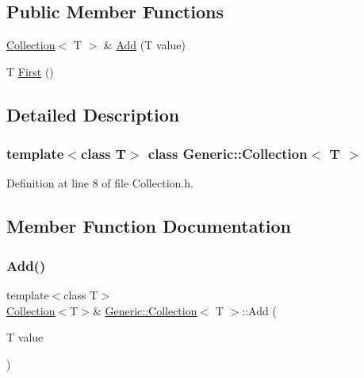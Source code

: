 \subsection*{Public Member Functions}
\begin{DoxyCompactItemize}
\item 
\mbox{\hyperlink{classGeneric_1_1Collection}{Collection}}$<$ T $>$ \& \mbox{\hyperlink{classGeneric_1_1Collection_a602c700fa46602ce551b5c133793924c}{Add}} (T value)
\item 
T \mbox{\hyperlink{classGeneric_1_1Collection_abc2e126c8aaaabf8e4ff8da2d35011c3}{First}} ()
\end{DoxyCompactItemize}


\subsection{Detailed Description}
\subsubsection*{template$<$class T$>$\newline
class Generic\+::\+Collection$<$ T $>$}



Definition at line 8 of file Collection.\+h.



\subsection{Member Function Documentation}
\mbox{\label{classGeneric_1_1Collection_a602c700fa46602ce551b5c133793924c}} 
\subsubsection{\texorpdfstring{Add()}{Add()}}
{\footnotesize\ttfamily template$<$class T$>$ \\
\mbox{\hyperlink{classGeneric_1_1Collection}{Collection}}$<$T$>$\& \mbox{\hyperlink{classGeneric_1_1Collection}{Generic\+::\+Collection}}$<$ T $>$\+::Add (\begin{DoxyParamCaption}\item[{T}]{value }\end{DoxyParamCaption})\hspace{0.3cm}{\ttfamily [inline]}}



